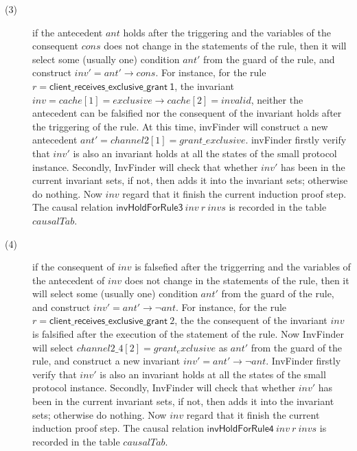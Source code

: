 \documentclass{llncs}
\begin{document}
\begin{description}
\item[(3)] if the antecedent   $ant$ holds after the triggering and the variables of the consequent   $cons$ does not change in the statements of the rule,
then it  will select some (usually one) condition $ant'$ from the
guard of the rule, and construct $inv'=ant' \longrightarrow cons$.
For instance, for the rule
$r=\mathsf{client\_receives\_exclusive\_grant~ 1}$, the invariant
$inv=cache[1] = exclusive \longrightarrow  cache[2] =invalid$,
neither the antecedent can be falsified nor the consequent of the
invariant holds after the triggering of the rule. At this time,
{\sf invFinder} will construct a new antecedent $ant'=channel2
[1] = grant\_exclusive$. {\sf invFinder} firstly verify that
$inv'$ is also an invariant holds at all the states of the small
protocol instance. Secondly, {\sf InvFinder} will check that
whether $inv'$ has been in the current invariant sets, if not, then
adds it into the invariant sets; otherwise do nothing. Now $inv$
regard that it finish the current induction proof step. The causal
    relation $\mathsf{invHoldForRule3}~inv~r~invs$ is   recorded in  the
    table $causalTab$.

\item[(4)] if the consequent of $inv$ is falsefied after the triggerring and the variables of the antecedent of $inv$ does not change in the statements of the
rule, then it  will select some (usually one) condition $ant'$ from
the guard of the rule, and construct $inv'=ant' \longrightarrow \neg
ant$. For instance, for the rule $r=\mathsf{client\_ receives\_
exclusive\_ grant}~ 2$, the the consequent of the invariant $inv$ is
falsified after the execution of the statement of the rule. Now
{\sf InvFinder} will select $channel2\_4[2] = grant_exclusive$
as $ant'$ from the guard of the rule, and construct a new invariant
$inv'=ant' \longrightarrow \neg ant$. {\sf InvFinder} firstly
verify that $inv'$ is also an invariant holds at all the states of
the small protocol instance. Secondly, {\sf InvFinder} will
check that whether $inv'$ has been in the current invariant sets, if
not, then adds it into the invariant sets; otherwise do nothing. Now
$inv$ regard that it finish the current induction proof step. The
causal
    relation $\mathsf{invHoldForRule4}~inv~r~invs$ is   recorded in  the
    table $causalTab$.


\end{description}
\end{document}
